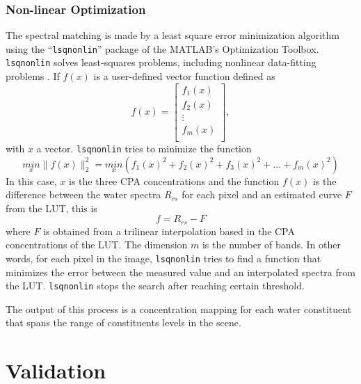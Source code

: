 \subsubsection{Non-linear Optimization}
The spectral matching is made by a least square error minimization algorithm using the ``\texttt{lsqnonlin}'' package of the MATLAB's Optimization Toolbox. \texttt{lsqnonlin} solves least-squares problems, including nonlinear data-fitting problems . If $f(x)$ is a user-defined vector function defined as
\begin{equation}
  f(x)=
  \left[
    \begin{array}{c}
      f_1(x) \\
      f_2(x) \\
      \vdots \\
      f_m(x) \\
    \end{array}
  \right],
\end{equation}
with $x$ a vector. \texttt{lsqnonlin} tries to minimize the function
\begin{equation}
  \underset{x}{min}\parallel f(x) \parallel^2_2=\underset{x}{min}(f_1(x)^2+f_2(x)^2+f_3(x)^2+...+f_m(x)^2)
\end{equation}
In this case, $x$ is the three CPA concentrations and the function $f(x)$ is the difference between the water spectra $R_{rs}$ for each pixel and an estimated curve $F$ from the LUT, this is
\begin{equation}
  f = R_{rs} - F
\end{equation}
where $F$ is obtained from a trilinear interpolation based in the CPA concentrations of the LUT. The dimension $m$ is the number of bands. In other words, for each pixel in the image, \texttt{lsqnonlin} tries to find a function that minimizes the error between the measured value and an interpolated spectra from the LUT. \texttt{lsqnonlin} stops the search after reaching certain threshold. 

The output of this process is a concentration mapping for each water constituent that spans the range of constituents levels in the scene. 


\section{Validation} 
\label{sec:val}
